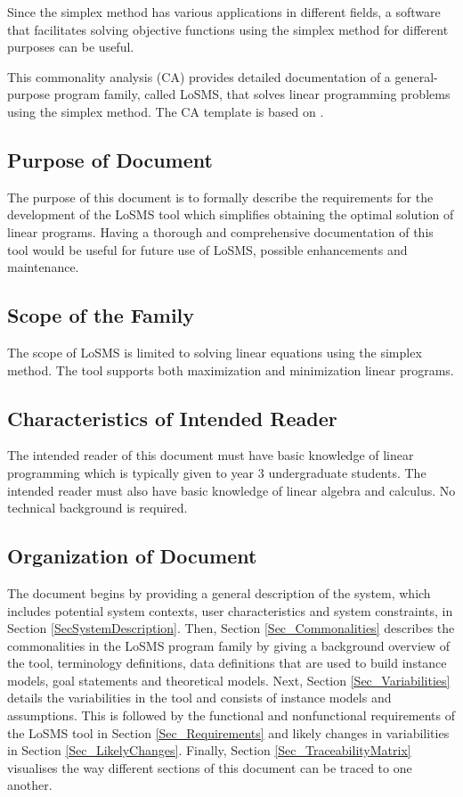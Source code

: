 \documentclass[12pt]{article}
\newcommand{\famname}{LoSMS} %
\begin{document}
Since the simplex method has various applications in different fields, a 
software that facilitates solving objective functions using the simplex method 
for different purposes can be useful. 

This commonality analysis (CA) provides detailed documentation of a 
general-purpose program family, called \famname{}, that solves linear 
programming problems using the simplex method. The CA template is based on 
\citet{Smith2006}.

\subsection{Purpose of Document}

The purpose of this document is to formally describe the requirements for the 
development of the \famname{} tool which simplifies obtaining the optimal 
solution of linear programs. Having a thorough and comprehensive documentation 
of this tool would be useful for future use of \famname{}, possible 
enhancements and maintenance.

\subsection{Scope of the Family} 

The scope of \famname{} is limited to solving linear equations using the 
simplex method. The tool supports both maximization and minimization linear 
programs.

\subsection{Characteristics of Intended Reader} 

The intended reader of this document must have basic knowledge of linear 
programming which is typically given to year 3 undergraduate students. The 
intended reader must also have basic knowledge of linear algebra and calculus. 
No technical background is required.

\subsection{Organization of Document}

The document begins by providing a general description of the system, which 
includes potential system contexts, user characteristics and system 
constraints, in Section \ref{SecSystemDescription}. Then, Section 
\ref{Sec_Commonalities} describes the commonalities in the \famname{} program 
family by giving a background overview of the tool, terminology definitions, 
data definitions that are used to build instance models, goal statements and 
theoretical models. Next, Section \ref{Sec_Variabilities} details the 
variabilities in the tool and consists of instance models and assumptions. This 
is followed by the functional and nonfunctional requirements of the \famname{} 
tool in Section \ref{Sec_Requirements} and likely changes in variabilities in 
Section \ref{Sec_LikelyChanges}. Finally, Section \ref{Sec_TraceabilityMatrix} 
visualises the way different sections of this document can be traced to one 
another. \\
\end{document}
